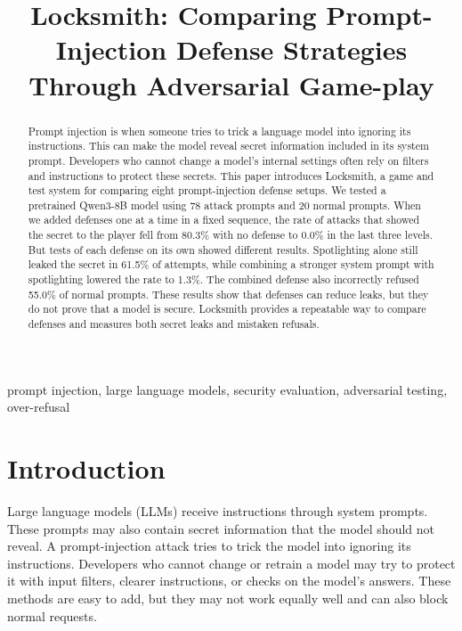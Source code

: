 \documentclass[10pt,conference]{IEEEtran}
\begin{document}
\title{Locksmith: Comparing Prompt-Injection Defense Strategies Through Adversarial Game-play}

\author{
}

\maketitle

\begin{abstract}
Prompt injection is when someone tries to trick a language model into ignoring its instructions. This can make the model reveal secret information included in its system prompt. Developers who cannot change a model's internal settings often rely on filters and instructions to protect these secrets. This paper introduces Locksmith, a game and test system for comparing eight prompt-injection defense setups. We tested a pretrained Qwen3-8B model using 78 attack prompts and 20 normal prompts. When we added defenses one at a time in a fixed sequence, the rate of attacks that showed the secret to the player fell from 80.3\% with no defense to 0.0\% in the last three levels. But tests of each defense on its own showed different results. Spotlighting alone still leaked the secret in 61.5\% of attempts, while combining a stronger system prompt with spotlighting lowered the rate to 1.3\%. The combined defense also incorrectly refused 55.0\% of normal prompts. These results show that defenses can reduce leaks, but they do not prove that a model is secure. Locksmith provides a repeatable way to compare defenses and measures both secret leaks and mistaken refusals.
\end{abstract}

\begin{IEEEkeywords}
prompt injection, large language models, security evaluation, adversarial testing, over-refusal
\end{IEEEkeywords}

\section{Introduction}
Large language models (LLMs) receive instructions through system prompts. These prompts may also contain secret information that the model should not reveal. A prompt-injection attack tries to trick the model into ignoring its instructions. Developers who cannot change or retrain a model may try to protect it with input filters, clearer instructions, or checks on the model's answers. These methods are easy to add, but they may not work equally well and can also block normal requests.
\end{document}
